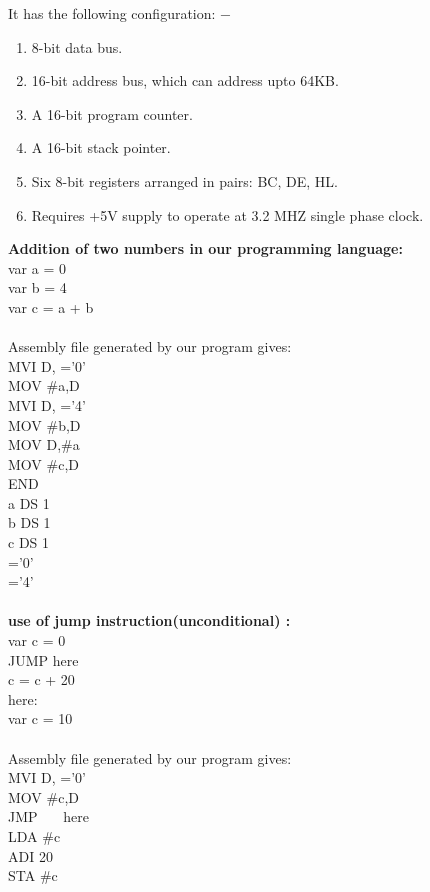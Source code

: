 \documentclass[12pt]{article}
\begin{document}
It has the following configuration: −\\

\begin{enumerate}
\item     8-bit data bus.
\item     16-bit address bus, which can address upto 64KB.
\item     A 16-bit program counter.
\item     A 16-bit stack pointer.
\item     Six 8-bit registers arranged in pairs: BC, DE, HL.
\item     Requires +5V supply to operate at 3.2 MHZ single phase clock.
\end{enumerate}


\textbf{Addition of two numbers in our programming language:} \\
var a = 0 \\
var b = 4 \\ 
var c = a + b \\\\
Assembly file generated by our program gives:\\
MVI D, ='0'\\
MOV \#a,D\\
MVI D, ='4'\\
MOV \#b,D\\
MOV D,\#a\\
MOV \#c,D\\
END\\
a DS 1\\
b DS 1\\
c DS 1\\
='0'\\
='4'\\\\
\textbf{use of jump instruction(unconditional) :}\\
var c = 0\\
JUMP here\\
c = c + 20\\
here:\\
var c = 10\\\\
Assembly file generated by our program gives:\\
MVI D, ='0'\\
MOV \#c,D\\
JMP ~~~here\\
LDA \#c\\
ADI 20\\
STA \#c\\
\end{document}
